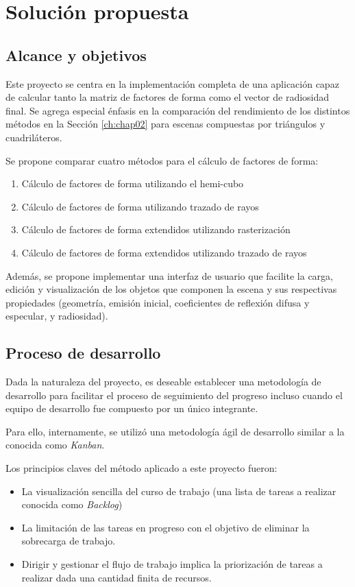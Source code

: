 \chapter{Solución propuesta}
\label{ch:chap03}

\section{Alcance y objetivos}
\label{sec:alcance}

Este proyecto se centra en la implementación completa de una aplicación capaz de calcular tanto la matriz de factores de forma como el vector de radiosidad final. Se agrega especial énfasis en la comparación del rendimiento de los distintos métodos en la Sección \ref{ch:chap02} para escenas compuestas por triángulos y cuadriláteros.

Se propone comparar cuatro métodos para el cálculo de factores de forma:

\begin{enumerate}
 	\item Cálculo de factores de forma utilizando el hemi-cubo
 	\item  Cálculo de factores de forma utilizando trazado de rayos
 	\item Cálculo de factores de forma extendidos utilizando rasterización
 	\item Cálculo de factores  de forma extendidos utilizando trazado de rayos
\end{enumerate}

Además, se propone implementar una interfaz de usuario que facilite la carga, edición y visualización de los objetos que componen la escena y sus respectivas propiedades (geometría, emisión inicial, coeficientes de reflexión difusa y especular, y radiosidad).

\section{Proceso de desarrollo}
\label{sec:procdes}

Dada la naturaleza del proyecto, es deseable establecer una metodología de desarrollo para facilitar el proceso de seguimiento del progreso incluso cuando el equipo de desarrollo fue compuesto por un único integrante.

Para ello, internamente, se utilizó una metodología ágil de desarrollo similar a la conocida como \textit{Kanban}.

Los principios claves del método aplicado a este proyecto fueron:
\begin{itemize}
	\item La visualización sencilla del curso de trabajo (una lista de tareas a realizar conocida como \textit{Backlog})
	\item La limitación de las tareas en progreso con el objetivo de eliminar la sobrecarga de trabajo.
	\item Dirigir y gestionar el flujo de trabajo implica la priorización de tareas a realizar dada una cantidad finita de recursos.
\end{itemize}

